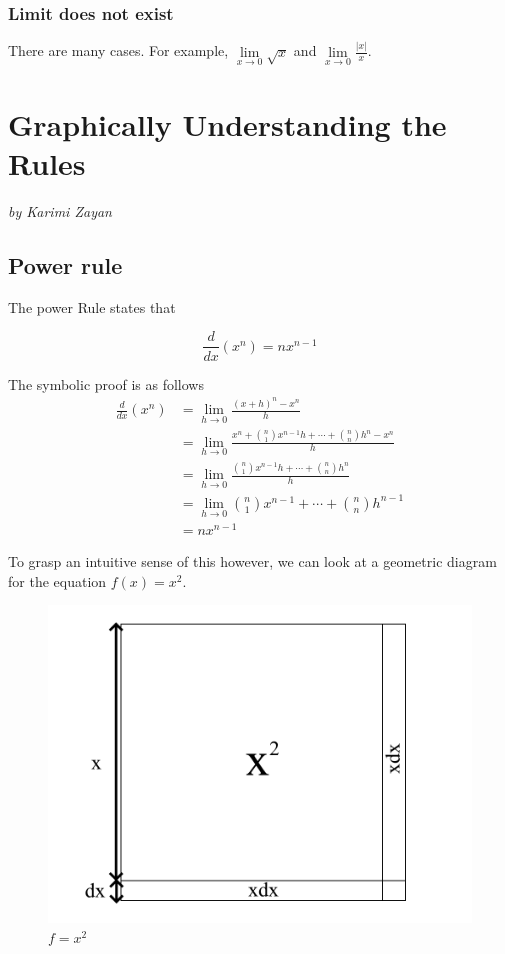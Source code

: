 \documentclass[a4paper,12pt,oneside]{book}
\begin{document}
\subsection{Limit does not exist}
There are many cases. For example,
$\lim\limits_{x \to 0} \sqrt{x}$ and
$\lim\limits_{x \to 0} \frac{|x|}{x}$.




\newpage
\chapter{Graphically Understanding the Rules}
\vspace{-30pt}
\large \textit{by Karimi Zayan}

\section{Power rule}

The power Rule states that

$$\frac{d}{dx}(x^n)=nx^{n-1}$$

 \noindent The symbolic proof is as follows
$$
\begin{aligned}
\frac{d}{dx}(x^n)&=\lim_{h\to 0}\frac{(x+h)^n-x^n}{h}\\
&=\lim_{h\to 0}\frac{x^n+\binom{n}{1}x^{n-1}h+\cdots +\binom{n}{n}h^n-x^n}{h}\\
&=\lim_{h\to 0}\frac{\binom{n}{1}x^{n-1}h+\cdots +\binom{n}{n}h^n}{h}\\
&=\lim_{h\to 0}\binom{n}{1}x^{n-1}+\cdots +\binom{n}{n}h^{n-1}\\
&=nx^{n-1}
\end{aligned}
$$

 \noindent To grasp an intuitive sense of this however, we can look at a geometric diagram for the equation $f(x)=x^2$.

\begin{figure}[H]
    \begin{center}
        \includegraphics[scale=0.35]{img/zayan/pr1.png}
        \caption{$f=x^2$}
        \label{fig:pr1}
    \end{center}
\end{figure}
\end{document}
